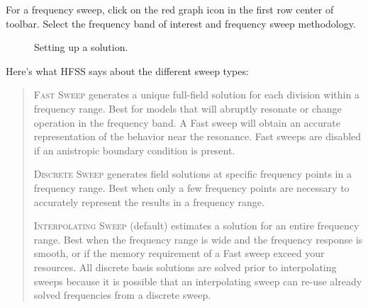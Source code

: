 \documentclass[11pt]{article}
\begin{document}
For a frequency sweep, click on the red graph icon in the first row center of toolbar. Select the frequency band of interest and frequency sweep methodology. 

\begin{figure}[H]
	\centering
	\caption{Setting up a solution.}
	\label{fig:solsetup}
\end{figure}

Here's what HFSS says about the different sweep types:
\blockquote{

\textsc{Fast Sweep} generates a unique full-field solution for each division within a frequency range. Best for models that will abruptly resonate or change operation in the frequency band. A Fast sweep will obtain an accurate representation of the behavior near the resonance. Fast sweeps are disabled if an anistropic boundary condition is present.

\textsc{Discrete Sweep} generates field solutions at specific frequency points in a frequency range. Best when only a few frequency points are necessary to accurately represent the results in a frequency range.

\textsc{Interpolating Sweep} (default) estimates a solution for an entire frequency range. Best when the frequency range is wide and the frequency response is smooth, or if the memory requirement of a Fast sweep exceed your resources. All discrete basis solutions are solved prior to interpolating sweeps because it is possible that an interpolating sweep can re-use already solved frequencies from a discrete sweep.

}
\end{document}
